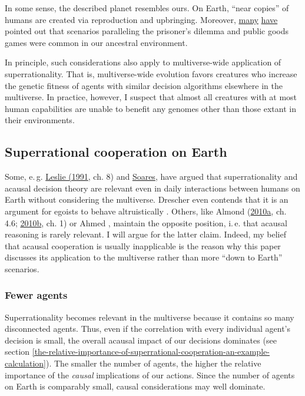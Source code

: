 In some sense, the described planet resembles ours. On Earth, ``near
copies'' of humans are created via reproduction and upbringing.
Moreover,
\href{http://mindingourway.com/newcomblike-problems-are-the-norm/}{many}
\href{https://en.wikipedia.org/wiki/Prisoner\%27s_dilemma\#Real-life_examples}{have}
pointed out that scenarios paralleling the prisoner's dilemma and public
goods games were common in our ancestral environment.

In principle, such considerations also apply to multiverse-wide
application of superrationality. That is, multiverse-wide evolution
favors creatures who increase the genetic fitness of agents with similar
decision algorithms elsewhere in the multiverse. In practice, however, I
suspect that almost all creatures with at most human capabilities are
unable to benefit any genomes other than those extant in their
environments.

\hypertarget{superrational-cooperation-on-earth}{\subsection{Superrational
cooperation on Earth}\label{superrational-cooperation-on-earth}}

Some, e.\,g.
\href{http://www.jstor.org/stable/2254984?seq=1\#page_scan_tab_contents}{Leslie
(1991}, ch. 8) and
\href{http://mindingourway.com/newcomblike-problems-are-the-norm/}{Soares}, have argued that
superrationality and acausal decision theory
are relevant even in daily interactions between humans on Earth without
considering the multiverse. Drescher even contends that it is an
argument for egoists to behave altruistically \citeyear{Drescher2006-ky}. Others, like Almond
(\href{https://casparoesterheld.files.wordpress.com/2016/12/almond_edt_1.pdf}{2010a},
ch. 4.6;
\href{https://web.archive.org/web/20120310010225/http://www.paul-almond.com/Correlation2.pdf}{2010b},
ch. 1) or Ahmed \citeyear{Ahmed2014-ec}, maintain the opposite
position, i.\,e. that acausal reasoning is rarely relevant. I will argue
for the latter claim. Indeed, my belief that acausal cooperation is
usually inapplicable is the reason why this paper discusses its
application to the multiverse rather than more ``down to Earth''
scenarios.

\subsubsection{Fewer agents}\label{fewer-agents}

Superrationality becomes relevant in the multiverse because it contains
so many disconnected agents. Thus, even if the correlation with every
individual agent's decision is small, the overall acausal impact of our
decisions dominates (see section
\ref{the-relative-importance-of-superrational-cooperation-an-example-calculation}). The smaller the number of agents, the higher the
relative importance of the \emph{causal} implications of our actions.
Since the number of agents on Earth is comparably small, causal
considerations may well dominate.

